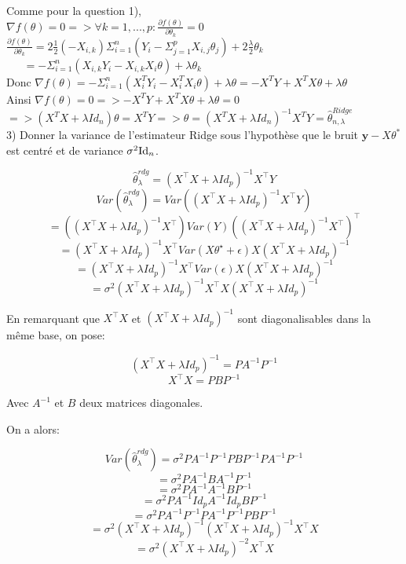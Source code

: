 Comme pour la question 1), \\
$\nabla f(\theta) = 0 => \forall k=1,...,p: \frac{\partial f(\theta)}{\partial \theta_k}=0$ \\

$\frac{\partial f(\theta)}{\partial \theta_k}=2\frac{1}{2} (-X_{i,k}) \Sigma_{i=1}^n (Y_i-\Sigma_{j=1}^pX_{i,j}\theta_j)+2\frac{\lambda}{2} \theta_k$ \\

$~~~~~~~=-\Sigma_{i=1}^n(X_{i,k}Y_i-X_{i,k}X_i\theta)+\lambda \theta_k$ \\

Donc $\nabla f(\theta)=-\Sigma_{i=1}^n(X_i^TY_i-X_i^TX_i\theta)+\lambda \theta=-X^TY+X^TX\theta + \lambda \theta$ \\

Ainsi $\nabla f(\theta)=0 => -X^TY+X^TX\theta + \lambda \theta=0$ \\
$=> (X^TX + \lambda Id_n)\theta = X^TY => \theta = (X^TX + \lambda Id_n)^{-1} X^TY = \hat{\theta}_{n,\lambda}^{Ridge} $ \\

3) Donner la variance de l'estimateur Ridge sous l’hypothèse que le bruit $\mathbf{y} -X \theta^*$ est centré et de variance $\sigma^2 {\rm Id}_n$.

$$\hat \theta_{\lambda}^{rdg} = (X^\top X+\lambda Id_p)^{-1}X^\top Y$$
$$Var(\hat \theta_{\lambda}^{rdg}) = Var((X^\top X+\lambda Id_p)^{-1}X^\top Y)$$ 
$$ = ((X^\top X+\lambda Id_p)^{-1}X^\top) Var(Y) ((X^\top X+\lambda Id_p)^{-1}X^\top)^\top$$ 
$$ = (X^\top X+\lambda Id_p)^{-1}X^\top Var(X \theta^\star + \epsilon)X(X^\top X+\lambda Id_p)^{-1}$$ 
$$ = (X^\top X+\lambda Id_p)^{-1}X^\top Var(\epsilon)X(X^\top X+\lambda Id_p)^{-1}$$ 
$$ = \sigma^2 (X^\top X+\lambda Id_p)^{-1}X^\top X(X^\top X+\lambda Id_p)^{-1}$$ 

En remarquant que $X^\top X$ et $(X^\top X+\lambda Id_p)^{-1}$ sont diagonalisables dans la même base, on pose:

$$(X^\top X+\lambda Id_p)^{-1} = PA^{-1}P^{-1}$$
$$X^\top X = PBP^{-1}$$

Avec $A^{-1}$ et $B$ deux matrices diagonales.

On a alors:

$$Var(\hat \theta_{\lambda}^{rdg}) = \sigma^2PA^{-1}P^{-1}PBP^{-1}PA^{-1}P^{-1}$$
$$ = \sigma^2PA^{-1}BA^{-1}P^{-1}$$
$$ = \sigma^2PA^{-1}A^{-1}BP^{-1}$$
$$ = \sigma^2PA^{-1}Id_pA^{-1}Id_pBP^{-1}$$
$$ = \sigma^2PA^{-1}P^{-1}PA^{-1}P^{-1}PBP^{-1}$$
$$ = \sigma^2 (X^\top X+\lambda Id_p)^{-1} (X^\top X+\lambda Id_p)^{-1}X^\top X$$
$$ = \sigma^2 (X^\top X+\lambda Id_p)^{-2} X^\top X$$






